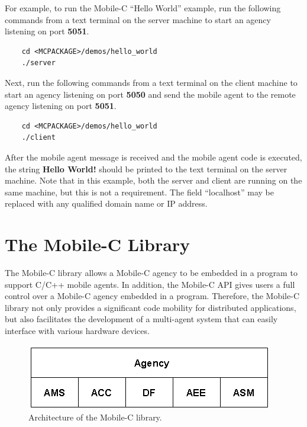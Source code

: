 \documentclass[11pt]{report}
\begin{document}
For example, to run the Mobile-C ``Hello World'' example, 
run the following commands from a text terminal on the server machine
to start an agency listening on port {\bf 5051}.

\begin{verbatim}
    cd <MCPACKAGE>/demos/hello_world
    ./server
\end{verbatim}

\noindent
Next, run the following commands from a text terminal on the client machine
to start an agency listening on 
port {\bf 5050} and send the mobile agent to the remote agency 
listening on port {\bf 5051}.\\

\begin{verbatim}
    cd <MCPACKAGE>/demos/hello_world
    ./client
\end{verbatim}

\noindent
After the mobile agent message is received and the mobile agent code is 
executed, the string {\bf Hello World!} should be printed to the text terminal 
on the server machine. Note that in this example, both the server and client
are running on the same machine, but this is not a requirement. The field
``localhost'' may be replaced with any qualified domain name or IP address. 



\section{The Mobile-C Library}
The Mobile-C library allows a Mobile-C agency to be embedded in a program to 
support C/C++ mobile agents.
In addition, the Mobile-C API gives users a full control over a Mobile-C 
agency embedded in a program. 
Therefore, the Mobile-C library not only provides a significant code mobility 
for distributed applications, but also facilitates the development of a 
multi-agent system that can easily interface with various hardware devices. 

\begin{figure}[!t]
\begin{center}
   \includegraphics[scale=0.5]{figure/mobilec_lib_arch}
   \caption{Architecture of the Mobile-C library.}
   \label{fig:mobilec_lib_arch}
\end{center}
\end{figure}
\end{document}
